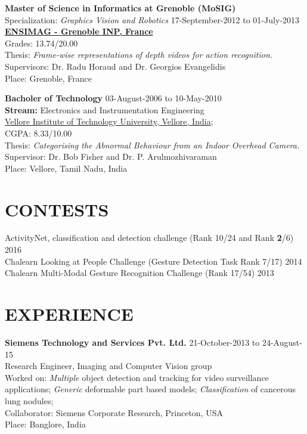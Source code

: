 \documentclass[line, margin]{res}
\begin{document}
\begin{resume}
\textbf{Master of Science in Informatics at Grenoble (MoSIG)}\\
Specialization: \emph{Graphics Vision and Robotics} \hfill 17-September-2012 to 01-July-2013\\
\href{http://ensimag.grenoble-inp.fr/}{\textbf{ENSIMAG - Grenoble INP, France}}\\
Grades: 13.74/20.00  \\
Thesis: \emph{Frame-wise representations of depth videos for action recognition.}\\
Supervisors: Dr. Radu Horaud and Dr. Georgios Evangelidis\\
Place: Grenoble, France

\textbf{Bacholer of Technology}   \hfill 03-August-2006 to 10-May-2010\\
\textbf{Stream:} Electronics and Instrumentation Engineering\\
\href{http://www.vit.ac.in/}{Vellore Institute of Technology University, Vellore, India};\\
CGPA: 8.33/10.00 \\%
Thesis: \emph{Categorising the Abnormal Behaviour from an Indoor Overhead Camera.}\\
Supervisor: Dr. Bob Fisher and Dr. P. Arulmozhivaraman\\
Place: Vellore, Tamil Nadu, India

\section{CONTESTS}
ActivityNet, classification and detection challenge (Rank 10/24 and Rank \textbf{2}/6) \hfill 2016\\
Chalearn Looking at People Challenge (Gesture Detection Task Rank 7/17) \hfill 2014\\
Chalearn Multi-Modal Gesture Recognition Challenge (Rank 17/54) \hfill 2013\\

\section{EXPERIENCE}
\textbf{Siemens Technology and Services Pvt. Ltd.} \hfill 21-October-2013 to 24-August-15 \\
Research Engineer, Imaging and Computer Vision group\\
Worked on: \emph{Multiple} object detection and tracking for video surveillance applications; 
\emph{Generic} deformable part based models; \emph{Classification} of cancerous lung nodules; \\
Collaborator: Siemens Corporate Research, Princeton, USA \\
Place: Banglore, India


\end{resume}
\end{document}
